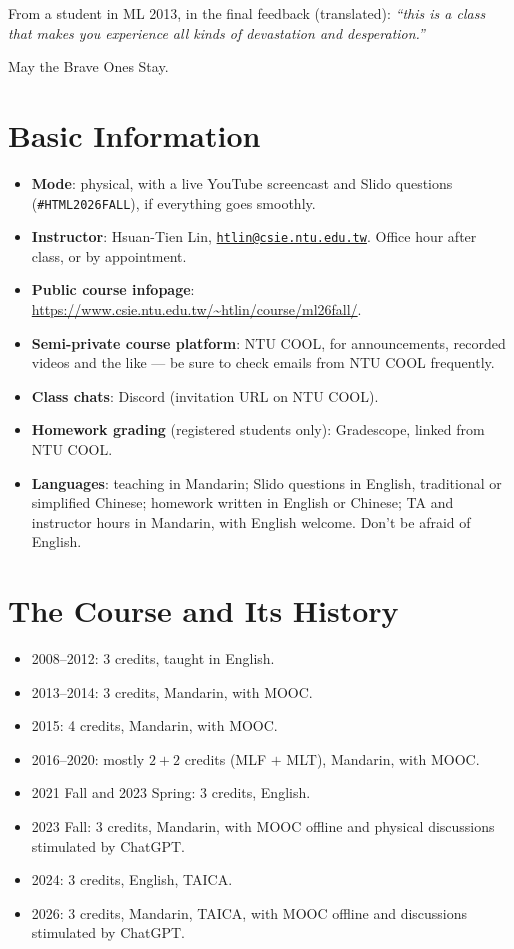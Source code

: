 \documentclass[a4paper,oneside]{scrbook}
\begin{document}
From a student in ML 2013, in the final feedback (translated): \emph{``this is a
class that makes you experience all kinds of devastation and desperation.''}

\begin{moral}
    May the Brave Ones Stay.
\end{moral}

\section*{Basic Information}

\begin{itemize}
    \item \textbf{Mode}: physical, with a live YouTube screencast and Slido
        questions (\texttt{\#HTML2026FALL}), if everything goes smoothly.
    \item \textbf{Instructor}: Hsuan-Tien Lin,
        \href{mailto:htlin@csie.ntu.edu.tw}{\nolinkurl{htlin@csie.ntu.edu.tw}}.
        Office hour after class, or by appointment.
    \item \textbf{Public course infopage}:
        \url{https://www.csie.ntu.edu.tw/~htlin/course/ml26fall/}.
    \item \textbf{Semi-private course platform}: NTU COOL, for announcements,
        recorded videos and the like --- be sure to check emails from NTU COOL
        frequently.
    \item \textbf{Class chats}: Discord (invitation URL on NTU COOL).
    \item \textbf{Homework grading} (registered students only): Gradescope,
        linked from NTU COOL.
    \item \textbf{Languages}: teaching in Mandarin; Slido questions in English,
        traditional or simplified Chinese; homework written in English or
        Chinese; TA and instructor hours in Mandarin, with English welcome.
        Don't be afraid of English.
\end{itemize}

\section*{The Course and Its History}

\begin{itemize}
    \item 2008--2012: 3 credits, taught in English.
    \item 2013--2014: 3 credits, Mandarin, with MOOC.
    \item 2015: 4 credits, Mandarin, with MOOC.
    \item 2016--2020: mostly \(2+2\) credits (MLF \(+\) MLT), Mandarin, with
        MOOC.
    \item 2021 Fall and 2023 Spring: 3 credits, English.
    \item 2023 Fall: 3 credits, Mandarin, with MOOC offline and physical
        discussions stimulated by ChatGPT.
    \item 2024: 3 credits, English, TAICA.
    \item 2026: 3 credits, Mandarin, TAICA, with MOOC offline and discussions
        stimulated by ChatGPT.
\end{itemize}
\end{document}
